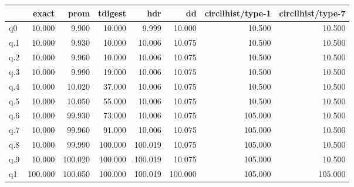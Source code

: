 \begin{tabular}{lrrrrrrr}
\toprule
{} &   exact &    prom &  tdigest &     hdr &      dd &  circllhist/type-1 &  circllhist/type-7 \\
\midrule
q0  &  10.000 &   9.900 &   10.000 &   9.999 &  10.000 &             10.500 &             10.500 \\
q.1 &  10.000 &   9.930 &   10.000 &  10.006 &  10.075 &             10.500 &             10.500 \\
q.2 &  10.000 &   9.960 &   10.000 &  10.006 &  10.075 &             10.500 &             10.500 \\
q.3 &  10.000 &   9.990 &   19.000 &  10.006 &  10.075 &             10.500 &             10.500 \\
q.4 &  10.000 &  10.020 &   37.000 &  10.006 &  10.075 &             10.500 &             10.500 \\
q.5 &  10.000 &  10.050 &   55.000 &  10.006 &  10.075 &             10.500 &             10.500 \\
q.6 &  10.000 &  99.930 &   73.000 &  10.006 &  10.075 &            105.000 &             10.500 \\
q.7 &  10.000 &  99.960 &   91.000 &  10.006 &  10.075 &            105.000 &             10.500 \\
q.8 &  10.000 &  99.990 &  100.000 & 100.019 &  10.075 &            105.000 &             10.500 \\
q.9 &  10.000 & 100.020 &  100.000 & 100.019 &  10.075 &            105.000 &             10.500 \\
q1  & 100.000 & 100.050 &  100.000 & 100.019 & 100.000 &            105.000 &            105.000 \\
\bottomrule
\end{tabular}
